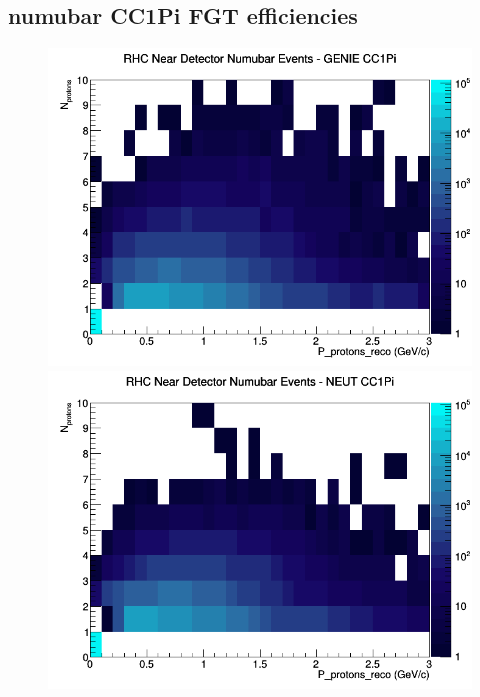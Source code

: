 \subsection{numubar CC1Pi FGT efficiencies}
\begin{figure}[h]
\includegraphics[width=\linewidth]{eff_N_P/FGT/protons/CC1Pi_RHC_ND_numubar_N_P_GENIE.png}
\endminipage
{}
\includegraphics[width=\linewidth]{eff_N_P/FGT/protons/CC1Pi_RHC_ND_numubar_N_P_NEUT.png}
\endminipage
{}

\end{figure}
